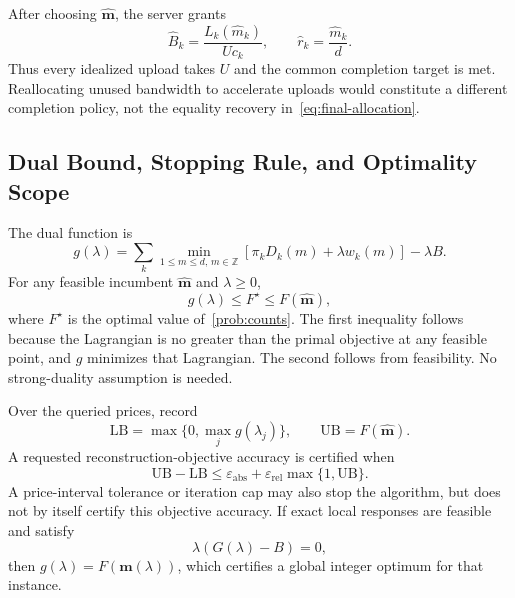 After choosing $\widehat{\mathbf m}$, the server grants
\begin{equation}
 \widehat B_k=\frac{L_k(\widehat m_k)}{Uc_k},\qquad
 \widehat r_k=\frac{\widehat m_k}{d}.
 \label{eq:final-allocation}
\end{equation}
Thus every idealized upload takes $U$ and the common completion target is met. Reallocating unused bandwidth to accelerate uploads would constitute a different completion policy, not the equality recovery in~\eqref{eq:final-allocation}.

\subsection{Dual Bound, Stopping Rule, and Optimality Scope}
The dual function is
\begin{equation}
 g(\lambda)=\sum_k\min_{1\le m\le d,\,m\in\mathbb Z}
 \left[\pi_kD_k(m)+\lambda w_k(m)\right]-\lambda B.
 \label{eq:dual}
\end{equation}
For any feasible incumbent $\widehat{\mathbf m}$ and $\lambda\ge0$,
\begin{equation}
 g(\lambda)\le F^\star\le F(\widehat{\mathbf m}),
 \label{eq:gap-bound}
\end{equation}
where $F^\star$ is the optimal value of~\eqref{prob:counts}. The first inequality follows because the Lagrangian is no greater than the primal objective at any feasible point, and $g$ minimizes that Lagrangian. The second follows from feasibility. No strong-duality assumption is needed.

Over the queried prices, record
\begin{equation}
 \mathrm{LB}=\max\{0,\max_jg(\lambda_j)\},\qquad
 \mathrm{UB}=F(\widehat{\mathbf m}).
 \label{eq:bounds}
\end{equation}
A requested reconstruction-objective accuracy is certified when
\begin{equation}
 \mathrm{UB}-\mathrm{LB}
 \le\varepsilon_{\mathrm{abs}}+
 \varepsilon_{\mathrm{rel}}\max\{1,\mathrm{UB}\}.
 \label{eq:gap-stop}
\end{equation}
A price-interval tolerance or iteration cap may also stop the algorithm, but does not by itself certify this objective accuracy. If exact local responses are feasible and satisfy
\begin{equation}
 \lambda\left(G(\lambda)-B\right)=0,
 \label{eq:complementarity}
\end{equation}
then $g(\lambda)=F(\mathbf m(\lambda))$, which certifies a global integer optimum for that instance.

